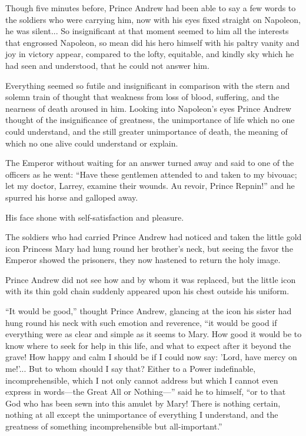 Though five minutes before, Prince Andrew had been able to say a
few words to the soldiers who were carrying him, now with his
eyes fixed straight on Napoleon, he was silent... So
insignificant at that moment seemed to him all the interests that
engrossed Napoleon, so mean did his hero himself with his paltry
vanity and joy in victory appear, compared to the lofty,
equitable, and kindly sky which he had seen and understood, that
he could not answer him.

Everything seemed so futile and insignificant in comparison with
the stern and solemn train of thought that weakness from loss of
blood, suffering, and the nearness of death aroused in
him. Looking into Napoleon's eyes Prince Andrew thought of the
insignificance of greatness, the unimportance of life which no
one could understand, and the still greater unimportance of
death, the meaning of which no one alive could understand or
explain.

The Emperor without waiting for an answer turned away and said to
one of the officers as he went: ``Have these gentlemen attended
to and taken to my bivouac; let my doctor, Larrey, examine their
wounds. Au revoir, Prince Repnin!'' and he spurred his horse and
galloped away.

His face shone with self-satisfaction and pleasure.

The soldiers who had carried Prince Andrew had noticed and taken
the little gold icon Princess Mary had hung round her brother's
neck, but seeing the favor the Emperor showed the prisoners, they
now hastened to return the holy image.

Prince Andrew did not see how and by whom it was replaced, but
the little icon with its thin gold chain suddenly appeared upon
his chest outside his uniform.

``It would be good,'' thought Prince Andrew, glancing at the icon
his sister had hung round his neck with such emotion and
reverence, ``it would be good if everything were as clear and
simple as it seems to Mary. How good it would be to know where to
seek for help in this life, and what to expect after it beyond
the grave! How happy and calm I should be if I could now say:
'Lord, have mercy on me!'... But to whom should I say that?
Either to a Power indefinable, incomprehensible, which I not only
cannot address but which I cannot even express in words---the
Great All or Nothing---'' said he to himself, ``or to that God who
has been sewn into this amulet by Mary! There is nothing certain,
nothing at all except the unimportance of everything I
understand, and the greatness of something incomprehensible but
all-important.''

